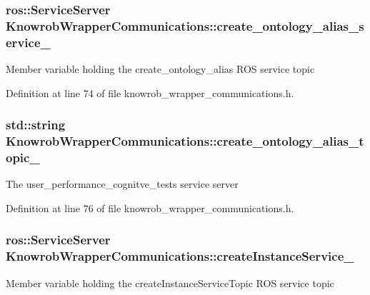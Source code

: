 \hypertarget{classKnowrobWrapperCommunications_a522e95f339e854d9202d212885cd542e}{
\subsubsection[{create\-\_\-ontology\-\_\-alias\-\_\-service\-\_\-}]{\setlength{\rightskip}{0pt plus 5cm}ros\-::\-Service\-Server Knowrob\-Wrapper\-Communications\-::create\-\_\-ontology\-\_\-alias\-\_\-service\-\_\-\hspace{0.3cm}{\ttfamily [private]}}}\label{classKnowrobWrapperCommunications_a522e95f339e854d9202d212885cd542e}
Member variable holding the create\-\_\-ontology\-\_\-alias R\-O\-S service topic 

Definition at line 74 of file knowrob\-\_\-wrapper\-\_\-communications.\-h.

\hypertarget{classKnowrobWrapperCommunications_ae3bf27737520a9ee4ce0ec43bffb15e4}{
\subsubsection[{create\-\_\-ontology\-\_\-alias\-\_\-topic\-\_\-}]{\setlength{\rightskip}{0pt plus 5cm}std\-::string Knowrob\-Wrapper\-Communications\-::create\-\_\-ontology\-\_\-alias\-\_\-topic\-\_\-\hspace{0.3cm}{\ttfamily [private]}}}\label{classKnowrobWrapperCommunications_ae3bf27737520a9ee4ce0ec43bffb15e4}
The user\-\_\-performance\-\_\-cognitve\-\_\-tests service server 

Definition at line 76 of file knowrob\-\_\-wrapper\-\_\-communications.\-h.

\hypertarget{classKnowrobWrapperCommunications_a2be003e4372235aba8c48f08ee160bdb}{
\subsubsection[{create\-Instance\-Service\-\_\-}]{\setlength{\rightskip}{0pt plus 5cm}ros\-::\-Service\-Server Knowrob\-Wrapper\-Communications\-::create\-Instance\-Service\-\_\-\hspace{0.3cm}{\ttfamily [private]}}}\label{classKnowrobWrapperCommunications_a2be003e4372235aba8c48f08ee160bdb}
Member variable holding the create\-Instance\-Service\-Topic R\-O\-S service topic 

